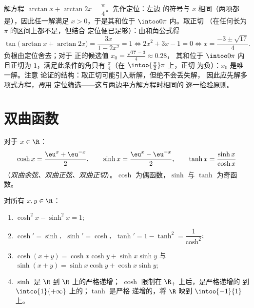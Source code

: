 \begin{example}[一个反正切方程]\label{ex:b1:functions:arctaneq}
解方程 $\arctan x + \arctan 2x = \dfrac\pi4$。先作定位：左边
的符号与 $x$ 相同（两项都是），因此任一解满足
$x > 0$，于是其和位于 $\intoo0\pi$ 内。取正切
（在任何长为 $\pi$ 的区间上都不是，但结合
定位便已足够）：由和角公式得
\[
\tan\bigl(\arctan x + \arctan 2x\bigr)
= \frac{3x}{1 - 2x^2} = 1
\iff 2x^2 + 3x - 1 = 0
\iff x = \frac{-3 \pm \sqrt{17}}4 .
\]
负根由定位舍去；对于
正的候选值 $x_0 = \frac{\sqrt{17} - 3}4 \approx 0.28$，
其和位于 $\intoo0\pi$ 内且正切为 $1$，满足此条件的角只有
$\frac\pi4$（在 $\intoo{\frac\pi2}\pi$ 上，正切
为负）：$x_0$ 是唯一解。注意
论证的结构：取正切可能引入新解，但绝不会丢失解，
因此应先解多项式方程，\emph{再}用
定位筛选——这与两边平方解方程时相同的
逐一检验原则。
\end{example}

\section{双曲函数}

\begin{definition}[$\cosh$, $\sinh$, $\tanh$]\label{def:b1:functions:hyperbolic}
对于 $x \in \R$：
\[
\cosh x = \frac{\eu^x + \eu^{-x}}{2},
\qquad
\sinh x = \frac{\eu^x - \eu^{-x}}{2},
\qquad
\tanh x = \frac{\sinh x}{\cosh x}
\]
（\emph{双曲余弦、双曲正弦、双曲正切}）。$\cosh$ 为偶函数，$\sinh$ 与 $\tanh$ 为奇函数。
\end{definition}

\begin{proposition}[基本性质]\label{prop:b1:functions:hyprules}
对所有 $x, y \in \R$：
\begin{enumerate}
  \item $\cosh^2 x - \sinh^2 x = 1$;
  \item $\cosh' = \sinh$, $\;\sinh' = \cosh$, $\;\tanh' = 1 - \tanh^2
        = \dfrac{1}{\cosh^2}$;
  \item $\cosh(x+y) = \cosh x\cosh y + \sinh x \sinh y$ 与
        $\sinh(x+y) = \sinh x \cosh y + \cosh x \sinh y$;
  \item $\sinh$ 是 $\R$ 到 $\R$ 上的严格递增；
        $\cosh$ 限制在 $\R_+$ 上后，是严格递增的
        到 $\intco{1}{+\infty}$ 上的；$\tanh$ 是严格
        递增的，将 $\R$ 映到 $\intoo{-1}{1}$ 上。
\end{enumerate}
\end{proposition}

